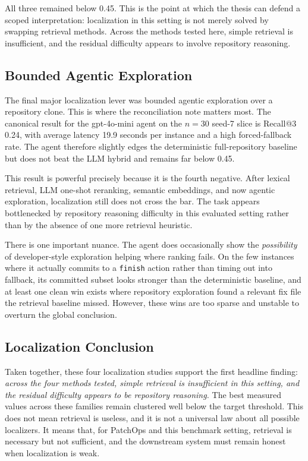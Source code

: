 All three remained below 0.45. This is the point at which the thesis can defend a scoped interpretation:
localization in this setting is not merely solved by swapping retrieval methods. Across the methods tested here,
simple retrieval is insufficient, and the residual difficulty appears to involve repository reasoning.

\subsection{Bounded Agentic Exploration}

The final major localization lever was bounded agentic exploration over a repository clone. This is
where the reconciliation note matters most. The canonical result for the gpt-4o-mini agent on the \(n=30\)
seed-7 slice is Recall@3 0.24, with average latency 19.9 seconds per instance and a high forced-fallback rate.
The agent therefore slightly edges the deterministic full-repository baseline but does not beat the LLM hybrid
and remains far below 0.45.

This result is powerful precisely because it is the fourth negative. After lexical retrieval, LLM one-shot
reranking, semantic embeddings, and now agentic exploration, localization still does not cross the bar. The
task appears bottlenecked by repository reasoning difficulty in this evaluated setting rather than by the
absence of one more retrieval heuristic.

There is one important nuance. The agent does occasionally show the \emph{possibility} of developer-style
exploration helping where ranking fails. On the few instances where it actually commits to a \texttt{finish}
action rather than timing out into fallback, its committed subset looks stronger than the deterministic baseline,
and at least one clean win exists where repository exploration found a relevant fix file the retrieval baseline
missed. However, these wins are too sparse and unstable to overturn the global conclusion.

\subsection{Localization Conclusion}

Taken together, these four localization studies support the first headline finding:
\emph{across the four methods tested, simple retrieval is insufficient in this setting, and the residual
difficulty appears to be repository reasoning.} The best measured values across these families remain clustered
well below the target threshold. This does not mean retrieval is useless, and it is not a universal law about
all possible localizers. It means that, for PatchOps and this benchmark setting, retrieval is necessary but not
sufficient, and the downstream system must remain honest when localization is weak.

